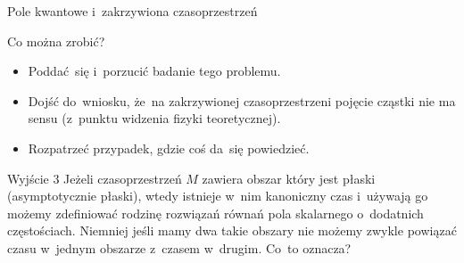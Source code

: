 \documentclass{beamer}  %
\begin{document}
\begin{frame}{Pole kwantowe i~zakrzywiona czasoprzestrzeń}

  \begin{block}{Co można zrobić?}
    \begin{itemize}
    \item[1.] Poddać~się i~porzucić badanie tego problemu.
    \item[2.] Dojść do~wniosku, że~na zakrzywionej czasoprzestrzeni
      pojęcie cząstki nie ma sensu (z~punktu widzenia fizyki
      teoretycznej).
    \item[3.] Rozpatrzeć przypadek, gdzie coś da~się powiedzieć.
    \end{itemize}
  \end{block}

  \begin{block}{Wyjście 3}
    Jeżeli czasoprzestrzeń $M$ zawiera obszar który jest płaski
    (asymptotycznie płaski), wtedy istnieje w~nim kanoniczny czas
    i~używają go możemy zdefiniować rodzinę rozwiązań równań pola
    skalarnego o~dodatnich częstościach. Niemniej jeśli mamy dwa takie
    obszary nie możemy zwykle powiązać czasu w~jednym obszarze
    z~czasem w~drugim. Co~to oznacza?
  \end{block}

\end{frame}
\end{document}
